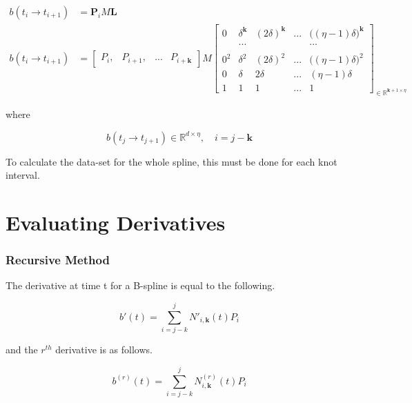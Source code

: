 \documentclass{article}
\begin{document}
\begin{equation}
\begin{aligned}
    b(t_i \rightarrow t_{i+1}) &= \textbf{P}_i M \textbf{L}\\
    b(t_i \rightarrow t_{i+1}) &= \begin{bmatrix} P_i, & P_{i+1}, & ... & P_{i+\textbf{k}} \end{bmatrix} M \begin{bmatrix} 0 & \delta^{\textbf{k}} & (2\delta)^{\textbf{k}}& ... & \big((\eta-1) \delta\big)^{\textbf{k}}\\
    & ... & & & ... \\ \\
    0^2 &  \delta^2 & (2\delta)^2 & ... & \big((\eta-1) \delta\big)^2 \\ 
     0 &  \delta & 2\delta & ... & (\eta-1) \delta \\ 
     1 & 1 & 1 & ... & 1 \end{bmatrix}_{\in \mathbb{R}^{\textbf{k}+1 \times \eta}}
\end{aligned}
\end{equation}

where

\begin{equation}
    b(t_j \rightarrow t_{j+1}) \in \mathbb{R}^{d \times \eta}, \quad i = j-\textbf{k}
\end{equation}
    
To calculate the data-set for the whole spline, this must be done for each knot interval.

\section{Evaluating Derivatives}

\subsubsection{Recursive Method}

The derivative at time t for a B-spline is equal to the following.

  \begin{equation} \label{eq:B-Spline derivative equation}
      b'(t) = \sum^{j}_{i=j-k} N'_{i,\textbf{k}}(t) P_i
  \end{equation}
  
  and the \(r^{th}\) derivative is as follows.
  
  \begin{equation} \label{eq:B-Spline rth derivative equation}
      b^{(r)}(t) = \sum^{j}_{i=j-k} N^{(r)}_{i,\textbf{k}}(t) P_i
  \end{equation}
\end{document}
